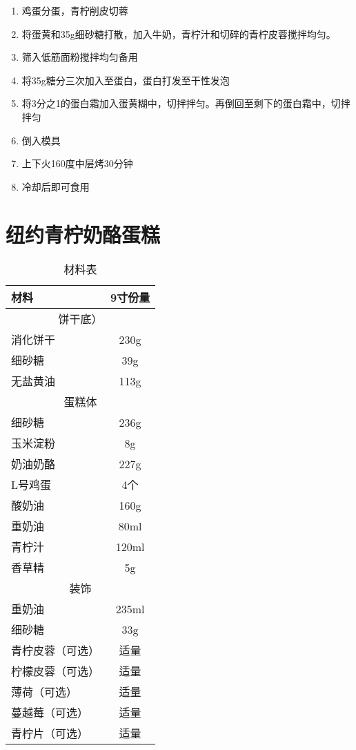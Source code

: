 \begin{enumerate}
    \item 鸡蛋分蛋，青柠削皮切蓉
    \item 将蛋黄和35g细砂糖打散，加入牛奶，青柠汁和切碎的青柠皮蓉搅拌均匀。
    \item 筛入低筋面粉搅拌均匀备用
    \item 将35g糖分三次加入至蛋白，蛋白打发至干性发泡
    \item 将3分之1的蛋白霜加入蛋黄糊中，切拌拌匀。再倒回至剩下的蛋白霜中，切拌拌匀
    \item 倒入模具
    \item 上下火160度中层烤30分钟
    \item 冷却后即可食用
\end{enumerate}


\section{纽约青柠奶酪蛋糕}

\begin{table}[h!]
    \centering
    \begin{tabular}{|l||c|}\hline
     \textbf{材料}    &  \textbf{9寸份量}\\ \hline\hline
    \multicolumn{2}{|c|}{饼干底）}\\ \hline
    消化饼干 & 230g \\ \hline
    细砂糖  & 39g \\ \hline
    无盐黄油 & 113g \\ \hline
    \multicolumn{2}{|c|}{蛋糕体}\\ \hline
    细砂糖  &  236g \\ \hline
    玉米淀粉  & 8g \\ \hline
    奶油奶酪  & 227g \\ \hline
    L号鸡蛋  & 4个 \\ \hline
    酸奶油  & 160g \\ \hline
    重奶油  & 80ml \\ \hline
    青柠汁 & 120ml \\ \hline
    香草精 & 5g \\ \hline
    \multicolumn{2}{|c|}{装饰}\\ \hline
    重奶油 & 235ml \\ \hline
    细砂糖 & 33g \\ \hline
    青柠皮蓉（可选） & 适量 \\ \hline
    柠檬皮蓉（可选） & 适量 \\ \hline
    薄荷（可选） & 适量 \\ \hline
    蔓越莓（可选） & 适量 \\ \hline
    青柠片（可选）& 适量 \\ \hline
    \end{tabular}
    \caption{材料表}
\end{table}

